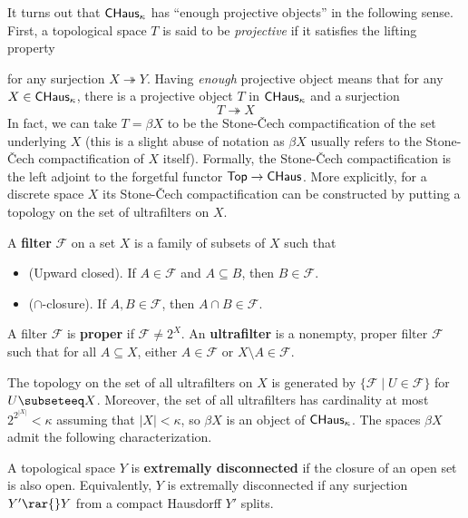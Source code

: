 \documentclass[./main.tex]{subfiles}
\begin{document}
It turns out that $\mathsf{CHaus}_\kappa$ has ``enough projective objects'' in the following sense. First, a topological space $T$ is said to be \textit{projective} if it satisfies the lifting property
\begin{center}
\end{center}
for any surjection $X \twoheadrightarrow Y$. Having \textit{enough} projective object means that for any $X \in \mathsf{CHaus}_\kappa$, there is a projective object $T$ in $\mathsf{CHaus}_\kappa$ and a surjection
$$T \twoheadrightarrow X$$
In fact, we can take $T = \beta X$ to be the Stone-\v{C}ech compactification of the set underlying $X$ (this is a slight abuse of notation as $\beta X$ usually refers to the Stone-\v{C}ech compactification of $X$ itself). Formally, the Stone-\v{C}ech compactification is the left adjoint to the forgetful functor $\mathsf{Top} \rightarrow \mathsf{CHaus}$. More explicitly, for a discrete space $X$ its Stone-\v{C}ech compactification can be constructed by putting a topology on the set of ultrafilters on $X$. 

\begin{definition}
A \textbf{filter} $\mathcal{F}$ on a set $X$ is a family of subsets of $X$ such that
\begin{itemize}
\item (Upward closed). If $A \in \mathcal{F}$ and $A \subseteq B$, then $B \in \mathcal{F}$.
\item ($\cap$-closure). If $A, B \in \mathcal{F}$, then $A \cap B \in \mathcal{F}$. 
\end{itemize}
A filter $\mathcal{F}$ is \textbf{proper} if $\mathcal{F} \neq 2^X$. An \textbf{ultrafilter} is a nonempty, proper filter $\mathcal{F}$ such that for all $A \subseteq X$, either $A \in \mathcal{F}$ or $X \setminus A \in \mathcal{F}$. 
\end{definition}

The topology on the set of all ultrafilters on $X$ is generated by $\{\mathcal{F} \mid U \in \mathcal{F}\}$ for $U \subseteeq X$. Moreover, the set of all ultrafilters has cardinality at most $2^{2^|X|} < \kappa$ assuming that $|X| < \kappa$, so $\beta X$ is an object of $\mathsf{CHaus}_\kappa$. The spaces $\beta X$ admit the following characterization. 

\begin{definition}
A topological space $Y$ is \textbf{extremally disconnected} if the closure of an open set is also open. Equivalently, $Y$ is extremally disconnected if any surjection $Y' \rar{} Y$ from a compact Hausdorff $Y'$ splits. 
\end{definition}
\end{document}
